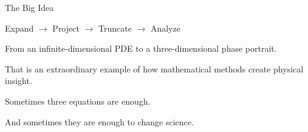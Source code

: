 \documentclass[aspectratio=169]{beamer}
\begin{document}
\begin{frame}{The Big Idea}
\begin{center}
\Huge
Expand $\rightarrow$ Project $\rightarrow$ Truncate $\rightarrow$ Analyze
\end{center}

\vspace{1em}

\begin{center}
From an infinite-dimensional PDE to a three-dimensional phase portrait.
\end{center}

\vspace{1em}

That is an extraordinary example of how mathematical methods create physical insight.
\end{frame}

\begin{frame}
\centering
{\Huge Sometimes three equations are enough.}

\vspace{1em}

{\Large And sometimes they are enough to change science.}
\end{frame}
\end{document}

